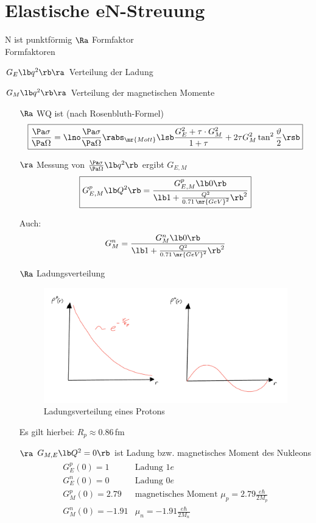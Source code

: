 \section{Elastische eN-Streuung}
N ist  punktförmig $\Ra$ Formfaktor\\
 Formfaktoren
\begin{compactitem}
\item $G_E\lb q^2\rb  \ra $ Verteilung der Ladung
\item $G_M\lb q^2\rb  \ra $ Verteilung der magnetischen Momente
\end{compactitem}
\begin{itemize}
\item[$\Ra$] WQ ist (nach Rosenbluth-Formel)
\begin{align}
\boxed{ \frac{\Pa \sigma}{\Pa \Omega} = \lno \frac{\Pa \sigma}{\Pa \Omega} \rabs_\mr{Mott} \lsb  \frac{G_E^2 +\tau \cdot G_M^2}{1 + \tau} + 2 \tau G_M^2 \tan^2 \frac{\vartheta}{2} \rsb  }
\end{align}
\item[$\ra$] Messung von $\frac{\Pa \sigma}{\Pa \Omega}\lb q^2\rb $ ergibt $G_{E,M}$
\begin{align}
\boxed{
G_{E,M}^p \lb Q^2\rb  = \frac{G_{E,M}^p \lb 0\rb }{\lb  1+ \frac{Q^2}{0.71\,\mr{GeV}^2}\rb ^2}
}
\end{align}

Auch:
\begin{align}
G_M^n = \frac{G_M^n \lb  0\rb }{\lb 1+ \frac{Q^2}{0.71\,\mr{GeV}^2}\rb ^2}
\end{align}
\item[$\Ra$] Ladungsverteilung
\begin{figure}[!ht]
\centering
\includegraphics[width=.5\textwidth]{imgs/ep5-fig-6-3.pdf}
\caption{Ladungsverteilung eines Protons\label{fig:6.3}}
\end{figure}

Es gilt hierbei: $R_p \approx 0.86$\,fm
\item[$\ra$] $G_{M,E} \lb  Q^2 = 0\rb $ ist Ladung bzw. magnetisches Moment des Nukleons
\begin{align*}
\begin{matrix}
G_E^p(0) = 1 & \text{Ladung 1}e\\
G_E^n(0) = 0 & \text{Ladung 0}e\\
G_M^p(0) = 2.79 & \text{magnetisches Moment }\mu_p= 2.79\frac{e\hbar}{2M_p}\\
G_M^n(0) = -1.91 & \mu_n = - 1.91\frac{e\hbar}{2M_n}
\end{matrix}
\end{align*}
\end{itemize}

